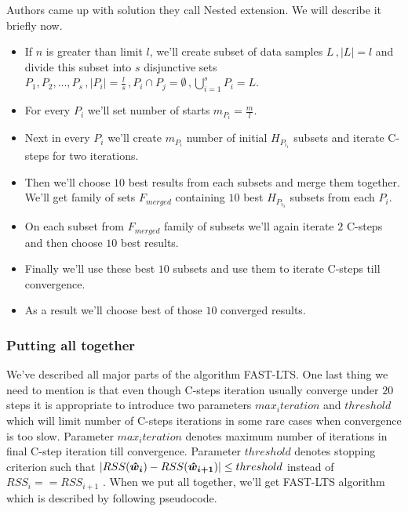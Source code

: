 Authors came up with solution they call Nested extension. We will describe it briefly now.
\begin{itemize}
	\item If $n$ is greater than limit $l$, we'll create subset of data samples $L\,, |L| = l$ and divide this subset into $s$ disjunctive sets $P_1,P_2,\ldots,P_s\,, |P_i| = \frac{l}{s}\,, P_i\cap P_j  = \emptyset\,, \bigcup_{i=1}^{s} P_{i} = L$.
	\item For every $P_i$ we'll set number of starts $m_{P_i} = \frac{m}{l}$. 
	\item Next in every $P_i$ we'll create $m_{P_i}$ number of initial $H_{P_{i_1}}$ subsets and iterate C-steps for two iterations.
	\item Then we'll choose $10$ best results from each subsets and merge them together. We'll get family of sets
	$F_{merged}$ containing $10$ best $H_{P_{i_3}}$ subsets from each $P_i$.
	\item On each subset from  $F_{merged}$ family of subsets we'll again iterate $2$ C-steps and then choose $10$ best results.
	\item Finally we'll use these best $10$ subsets and use them to iterate C-steps till convergence.
	\item As a result we'll choose best of those $10$ converged results.
\end{itemize} 

\subsubsection{Putting all together}
We've described all major parts of the algorithm FAST-LTS. One last thing we need to mention is that even though C-steps iteration usually converge under $20$ steps it is appropriate to introduce two parameters $max_iteration$ and $threshold$ which will limit number of C-steps iterations in some rare cases when convergence is too slow. Parameter $max_iteration$ denotes maximum number of iterations in final C-step iteration till convergence. Parameter $threshold$ denotes stopping criterion such that $| RSS(\boldsymbol{\hat{w}_{i}}) - RSS(\boldsymbol{\hat{w}_{i+1}})| \leq threshold$ instead of 
$RSS_{i} == RSS_{i+1}$ . When we put all together, we'll get FAST-LTS algorithm which is described by following pseudocode.


